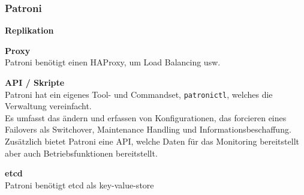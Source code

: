 
\subsubsection{Patroni}
\begin{flushleft}
    
\end{flushleft}
\begin{flushleft}
    \textbf{Replikation}\\

\end{flushleft}
\begin{flushleft}
    \textbf{Proxy}\\
    Patroni benötigt einen \Gls{HAProxy}, um Load Balancing usw. \cite{VYXTI7BS}
\end{flushleft}
\begin{flushleft}
    \textbf{API / Skripte}\\
    Patroni hat ein eigenes Tool- und Commandset, \texttt{patronictl}, welches die Verwaltung vereinfacht.\\
    Es umfasst das ändern und erfassen von Konfigurationen, das forcieren eines Failovers als Switchover, Maintenance Handling und Informationsbeschaffung.\\

    Zusätzlich bietet Patroni eine API, welche Daten für das Monitoring bereitstellt aber auch Betriebsfunktionen bereitstellt.\\
\end{flushleft}
\begin{flushleft}
    \textbf{\gls{etcd}}\\
    Patroni benötigt etcd als key-value-store
\end{flushleft}
